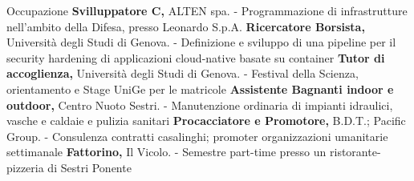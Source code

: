 \begin{rubric}{Occupazione}
\entry*[11/2025 -- presente]%
	\textbf{Svilluppatore C,} ALTEN spa.\newline
    - Programmazione di infrastrutture nell'ambito della Difesa, presso Leonardo S.p.A.
%
\entry*[07/2024 -- 10/2025]%
	\textbf{Ricercatore Borsista,} Università degli Studi di Genova.\newline
    - Definizione e sviluppo di una pipeline per il security hardening di applicazioni cloud-native basate su container 
%
\entry*[2023 -- 2024]%
	\textbf{Tutor di accoglienza,} Università degli Studi di Genova.\newline
    -  Festival della Scienza, orientamento e Stage UniGe per le matricole
%
\entry*[2018 -- 06/2024]%
	\textbf{Assistente Bagnanti indoor e outdoor,}  Centro Nuoto Sestri.\newline
    - Manutenzione ordinaria di impianti idraulici, vasche e caldaie e pulizia sanitari
%
%
\entry*[2020]%
	\textbf{Procacciatore e Promotore,} B.D.T.; Pacific Group.\newline
    - Consulenza contratti casalinghi; promoter organizzazioni umanitarie settimanale
%
\entry*[2019 -- 2020]%
	\textbf{Fattorino,} Il Vicolo.\newline
    - Semestre part-time presso un ristorante-pizzeria di Sestri Ponente
%
\end{rubric}